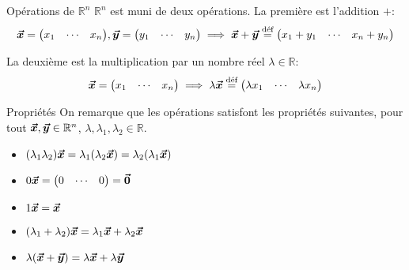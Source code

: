 \documentclass[a4paper]{article}
\begin{document}
\begin{parag}{Opérations de $\mathbb{R}^n$}
    $\mathbb{R}^n$ est muni de deux opérations. La première est l'addition $+$: 
    \[\bvec{x} = \begin{pmatrix} x_1 & \cdots & x_n \end{pmatrix}, \bvec{y} = \begin{pmatrix} y_1 & \cdots & y_n \end{pmatrix} \implies \bvec{x} + \bvec{y} \over{=}{déf} \begin{pmatrix} x_1 + y_1 & \cdots & x_n + y_n \end{pmatrix}\]
    
    La deuxième est la multiplication par un nombre réel $\lambda \in \mathbb{R}$: 
    \[\bvec{x} = \begin{pmatrix} x_1 & \cdots & x_n \end{pmatrix} \implies \lambda \bvec{x} \over{=}{déf} \begin{pmatrix} \lambda x_1 & \cdots & \lambda x_n \end{pmatrix}\]

    \begin{subparag}{Propriétés}
        On remarque que les opérations satisfont les propriétés suivantes, pour tout $\bvec{x}, \bvec{y} \in \mathbb{R}^n$, $\lambda, \lambda_1, \lambda_2 \in \mathbb{R}$.
        \begin{itemize}
            \item $\left(\lambda_1 \lambda_2\right) \bvec{x} = \lambda_1 \left(\lambda_2 \bvec{x}\right) = \lambda_2 \left(\lambda_1 \bvec{x}\right)$
            \item $0 \bvec{x} = \begin{pmatrix} 0 & \cdots & 0 \end{pmatrix} = \bvec{0}$
            \item $1 \bvec{x}= \bvec{x}$
            \item $\left(\lambda_1 + \lambda_2\right)\bvec{x} = \lambda_1 \bvec{x} + \lambda_2 \bvec{x}$
            \item $\lambda\left(\bvec{x} + \bvec{y}\right) = \lambda \bvec{x} + \lambda \bvec{y}$
        \end{itemize}
    \end{subparag}
    
\end{parag}
\end{document}
